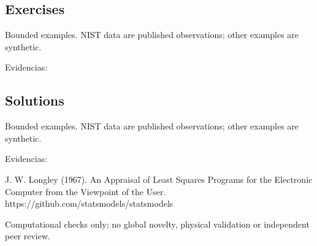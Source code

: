 \documentclass{article}
\begin{document}
\subsection*{Exercises}
Bounded examples. NIST data are published observations; other examples are synthetic.\par
Evidencias: \par
\subsection*{Solutions}
Bounded examples. NIST data are published observations; other examples are synthetic.\par
Evidencias: \par
[ref\_9461a7201cac9c1b4e5b5bb0] J. W. Longley (1967). An Appraisal of Least Squares Programs for the Electronic Computer from the Viewpoint of the User. https://github.com/statsmodels/statsmodels\par
Computational checks only; no global novelty, physical validation or independent peer review.
\end{document}
